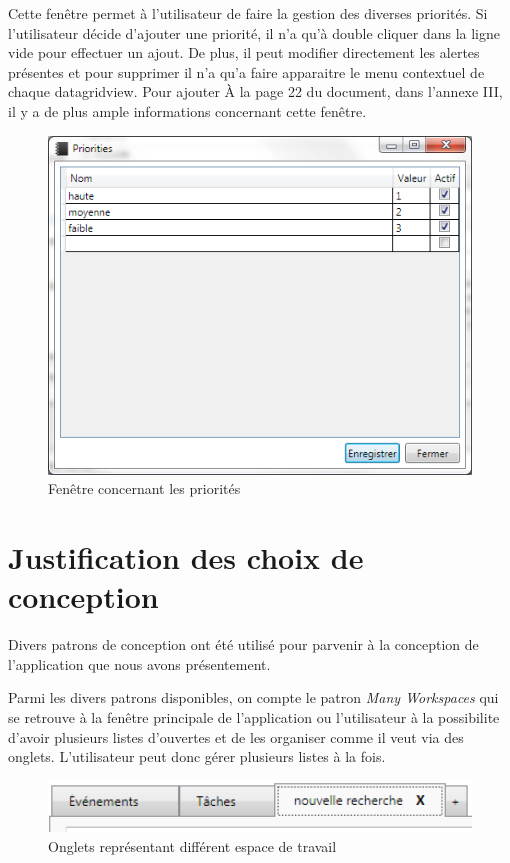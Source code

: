 \documentclass[letterpaper, oneside, 12pt, these, creativecommons]{thETS}
\begin{document}
Cette fenêtre permet à l'utilisateur de faire la gestion des diverses priorités.  Si l'utilisateur décide d'ajouter une priorité, il n'a qu'à double cliquer dans la ligne vide pour effectuer un ajout. De plus, il peut modifier directement les alertes présentes et pour supprimer il n'a qu'a faire apparaitre le menu contextuel de chaque datagridview. Pour ajouter À la page 22 du document, dans l'annexe III, il y a de plus ample informations concernant cette fenêtre.

\begin{figure}[H!]
	\centering
	\includegraphics[width=1\textwidth]{fenetre_priorite.png}
	\caption{Fenêtre concernant les priorités}
\end{figure}

\newpage

\section{Justification des choix de conception}

Divers patrons de conception ont été utilisé pour parvenir à la conception de l'application que nous avons présentement. 

Parmi les divers patrons disponibles, on compte le patron \emph{Many Workspaces} qui se retrouve à la fenêtre principale de l'application ou l'utilisateur à la possibilite d'avoir plusieurs listes d'ouvertes et de les organiser comme il veut via des onglets. L'utilisateur peut donc gérer plusieurs listes à la fois. 

\begin{figure}[H!]
	\centering
	\includegraphics[width=1\textwidth]{many_workspaces.png}
	\caption{Onglets représentant différent espace de travail}
\end{figure}
\end{document}
